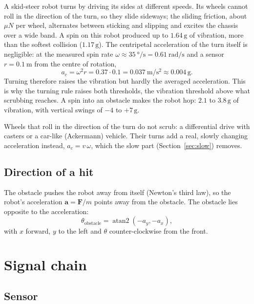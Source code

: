 \documentclass[11pt,a4paper]{article}
\newcommand{\g}{\,\mathrm{g}}
\begin{document}
A skid-steer robot turns by driving its sides at different speeds. Its wheels cannot roll in
the direction of the turn, so they slide sideways; the sliding friction, about $\mu N$ per wheel,
alternates between sticking and slipping and excites the chassis over a wide band. A spin on
this robot produced up to $1.64\g$ of vibration, more than the softest collision ($1.17\g$).
The centripetal acceleration of the turn itself is negligible: at the measured spin rate
$\omega \approx \SI{35}{\degree\per\second} = \SI{0.61}{\radian\per\second}$ and a sensor
$r = \SI{0.1}{\metre}$ from the centre of rotation,
\begin{equation}
  a_c = \omega^2 r = 0.37 \cdot 0.1 = \SI{0.037}{\metre\per\second\squared} \approx 0.004\g .
\end{equation}
Turning therefore raises the vibration but hardly the averaged acceleration. This is why the
turning rule raises both thresholds, the vibration threshold above what scrubbing reaches. A
spin into an obstacle makes the robot hop: $2.1$ to $3.8\g$ of vibration, with vertical swings
of $-4$ to $+7\g$.

Wheels that roll in the direction of the turn do not scrub: a differential drive with casters
or a car-like (Ackermann) vehicle. Their turns add a real, slowly changing acceleration
instead, $a_c = v\,\omega$, which the slow part (Section~\ref{sec:slow}) removes.

\subsection{Direction of a hit}

The obstacle pushes the robot away from itself (Newton's third law), so the robot's
acceleration $\bm a = \bm F / m$ points away from the obstacle. The obstacle lies opposite to the
acceleration:
\begin{equation}
  \theta_\text{obstacle} = \operatorname{atan2}(-a_y, -a_x),
\end{equation}
with $x$ forward, $y$ to the left and $\theta$ counter-clockwise from the front.

\section{Signal chain}

\subsection{Sensor}
\end{document}
